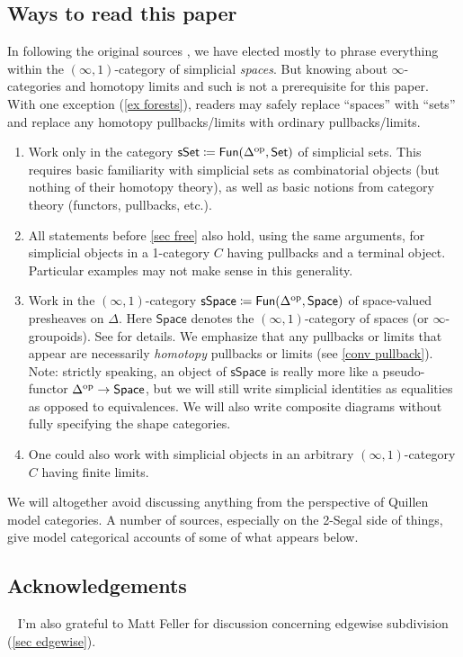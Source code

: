 \documentclass{amsart}
\theoremstyle{definition}
\theoremstyle{remark}
\newcommand{\set}{\mathsf{Set}}
\newcommand{\spaces}{\mathsf{Space}}
\newcommand{\sset}{\mathsf{sSet}}
\newcommand{\sspace}{\mathsf{sSpace}}
\newcommand{\fun}{\mathsf{Fun}}
\newcommand{\op}{\textup{op}}
\newcommand{\phnoteil}[1]{\ \todo[inline,color=purple!40,linecolor=purple!40!black,size=\normalsize]{#1}}
\begin{document}
\subsection{Ways to read this paper}\label{sec ways to read}
In following the original sources \cite{GKT1,GKT2,GKT3}, we have elected mostly to phrase everything within the $(\infty,1)$-category of simplicial \emph{spaces}.
But knowing about $\infty$-categories and homotopy limits and such is not a prerequisite for this paper.
With one exception (\cref{ex forests}), readers may safely replace ``spaces'' with ``sets'' and replace any homotopy pullbacks/limits with ordinary pullbacks/limits.
\begin{enumerate}[left=0pt]
\item Work only in the category $\sset \coloneqq \fun(\Delta^\op, \set)$ of simplicial sets. This requires basic familiarity with simplicial sets as combinatorial objects (but nothing of their homotopy theory), as well as basic notions from category theory (functors, pullbacks, etc.).
\item All statements before \cref{sec free} also hold, using the same arguments, for simplicial objects in a 1-category $C$ having pullbacks and a terminal object. 
Particular examples may not make sense in this generality.
\item Work in the $(\infty,1)$-category $\sspace \coloneqq \fun(\Delta^\op, \spaces)$ of space-valued presheaves on $\Delta$.
Here $\spaces$ denotes the $(\infty,1)$-category of spaces (or $\infty$-groupoids).
See \cite{GKT1} for details.
We emphasize that any pullbacks or limits that appear are necessarily \emph{homotopy} pullbacks or limits (see \cref{conv pullback}).
Note: strictly speaking, an object of $\sspace$ is really more like a pseudo-functor $\Delta^\op \to \spaces$, but we will still write simplicial identities as equalities as opposed to equivalences.
We will also write composite diagrams without fully specifying the shape categories.
\item 
One could also work with simplicial objects in an arbitrary $(\infty,1)$-category $C$ having finite limits.
\end{enumerate}
We will altogether avoid discussing anything from the perspective of Quillen model categories.
A number of sources, especially on the 2-Segal side of things, give model categorical accounts of some of what appears below.

\subsection*{Acknowledgements}
\phnoteil{Organizers, BIRS, etc.}
I'm also grateful to Matt Feller for discussion concerning edgewise subdivision (\cref{sec edgewise}).
\end{document}
